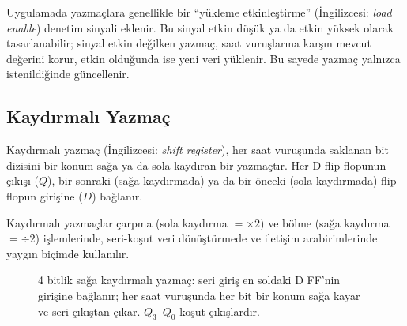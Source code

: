 Uygulamada yazmaçlara genellikle bir ``yükleme etkinleştirme'' (İngilizcesi: \textit{load enable}) denetim sinyali eklenir. Bu sinyal etkin düşük ya da etkin yüksek olarak tasarlanabilir; sinyal etkin değilken yazmaç, saat vuruşlarına karşın mevcut değerini korur, etkin olduğunda ise yeni veri yüklenir. Bu sayede yazmaç yalnızca istenildiğinde güncellenir.

\subsection{Kaydırmalı Yazmaç}

Kaydırmalı yazmaç (İngilizcesi: \textit{shift register}), her saat vuruşunda saklanan bit dizisini bir konum sağa ya da sola kaydıran bir yazmaçtır. Her D flip-flopunun çıkışı ($Q$), bir sonraki (sağa kaydırmada) ya da bir önceki (sola kaydırmada) flip-flopun girişine ($D$) bağlanır.

Kaydırmalı yazmaçlar çarpma (sola kaydırma $= \times 2$) ve bölme (sağa kaydırma $= \div 2$) işlemlerinde, seri-koşut veri dönüştürmede ve iletişim arabirimlerinde yaygın biçimde kullanılır.

\begin{figure}[H]
\centering
{}
\caption{4 bitlik sağa kaydırmalı yazmaç: seri giriş en soldaki D FF'nin girişine bağlanır; her saat vuruşunda her bit bir konum sağa kayar ve seri çıkıştan çıkar. $Q_3$--$Q_0$ koşut çıkışlardır.}
\label{fig:kaydirmali-yazmac}
\end{figure}

